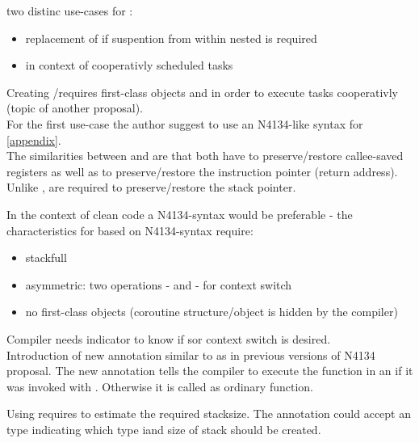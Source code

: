two distinc use-cases for \sfcoros:
\begin{itemize}
    \item replacement of \slcoros if suspention from within nested \cstack is
          required
    \item in context of cooperativly scheduled tasks
\end{itemize}

Creating \fibers/\uthreads requires first-class objects and \sycoros in order
to execute tasks cooperativly (topic of another proposal).\\
For the first use-case the author suggest to use an N4134-like syntax for
\sfcoros\ref{appendix}.\\
The similarities between \sfcoros and \slcoros are that both have to
preserve/restore callee-saved registers as well as to preserve/restore
the instruction pointer (return address).\\
Unlike \sless, \sfcoro are required to preserve/restore the stack pointer.

In the context of clean code a \sfull N4134-syntax would be preferable - the
characteristics for \sfcoros based on N4134-syntax require:
\begin{itemize}
    \item stackfull
    \item asymmetric: two operations - \await and \yield - for context switch
    \item no first-class objects (coroutine structure/object is hidden by the
          compiler)
\end{itemize}

Compiler needs indicator to know if s\sless or \sfull context switch is desired.\\
Introduction of new annotation \sfanno similar to \resumable as in previous versions
of N4134 proposal. The new annotation tells the compiler to execute the function in
an \sfcoro if it was invoked with \await. Otherwise it is called as ordinary function.\\

Using \sfcoros requires to estimate the required stacksize. The annotation could accept
an type indicating which type iand size of stack should be created.\\
